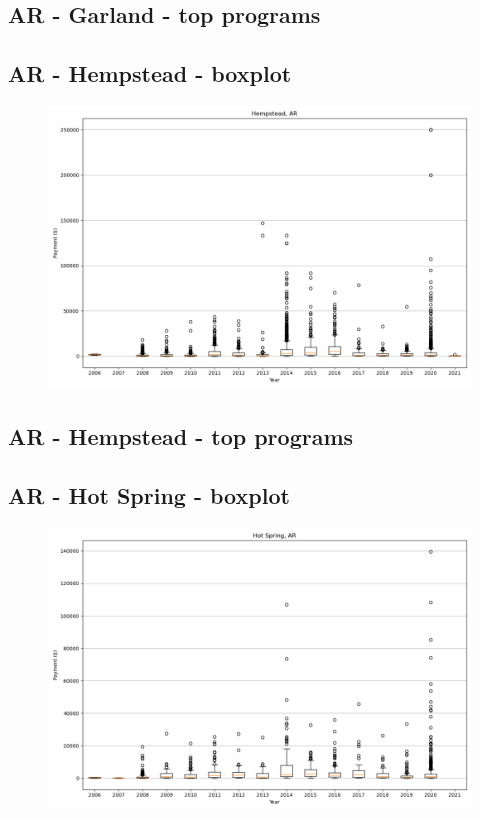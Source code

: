 \subsection*{AR - Garland - top programs}

\newpage
\subsection*{AR - Hempstead - boxplot}
\begin{figure}[h]
\centering
\includegraphics[width=7in]{../output/boxplots/counties/Hempstead-AR_boxplot.png}
\end{figure}


\subsection*{AR - Hempstead - top programs}

\newpage
\subsection*{AR - Hot Spring - boxplot}
\begin{figure}[h]
\centering
\includegraphics[width=7in]{../output/boxplots/counties/Hot Spring-AR_boxplot.png}
\end{figure}


